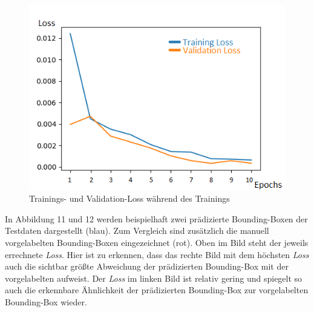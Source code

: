 \begin{figure}[!htb] 
  \centering
  \includegraphics[width=13.8cm]{Abb/training_progress.png}
  \caption{Trainings- und Validation-Loss während des Trainings}
  \label{lossbild}
\end{figure} 
In Abbildung 11 und 12 werden beispielhaft zwei prädizierte Bounding-Boxen der Testdaten dargestellt (blau). Zum Vergleich sind zusätzlich die manuell vorgelabelten Bounding-Boxen eingezeichnet (rot). Oben im Bild steht der jeweils errechnete \textit{Loss}. Hier ist zu erkennen, dass das rechte Bild mit dem höchsten \textit{Loss} auch die sichtbar größte Abweichung der prädizierten Bounding-Box mit der vorgelabelten aufweist. Der \textit{Loss} im linken Bild ist relativ gering und spiegelt so auch die erkennbare Ähnlichkeit der prädizierten Bounding-Box zur vorgelabelten Bounding-Box wieder.\\ \label{pred_boxes}

